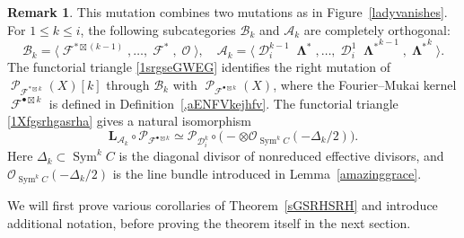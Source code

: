 \documentclass[11pt,letterpaper]{amsart}
\theoremstyle{plain}
\theoremstyle{definition}
\newtheorem{remark}[theorem]{Remark}
\theoremstyle{remark}
\numberwithin{equation}{section}
\DeclareMathOperator{\cD}{\mathcal{D}}
\DeclareMathOperator{\cF}{\mathcal{F}}
\DeclareMathOperator{\cO}{\mathcal{O}}
\DeclareMathOperator{\cP}{\mathcal{P}}
\DeclareMathOperator{\bLambda}{{\boldsymbol\Lambda}}
\begin{document}
\begin{remark}\label{Remark33}
This mutation combines two mutations as in Figure~\ref{ladyvanishes}. 
For $1\le k\le i$, the following subcategories $\mathcal B_k$ and $\mathcal A_k$
 are completely orthogonal:
\[
\mathcal B_k=
\bigl\langle\cF^{*\boxtimes(k-1)},\ldots,\cF^*,\cO\bigr\rangle,
\quad
\mathcal A_k=
\bigl\langle
\cD_i^{k-1}\bLambda^*,\ldots,
\cD_i^1{\bLambda^*}^{k-1},{\bLambda^*}^{k}
\bigr\rangle.
\]
The functorial triangle
\eqref{1srgseGWEG} identifies the right mutation of
$\cP_{\cF^{*\boxtimes k}}(X)[k]$ through $\mathcal B_k$
with $\cP_{\cF^{\bullet\boxtimes k}}(X)$, where the Fourier--Mukai kernel $\cF^{\bullet\boxtimes k}$ 
is defined in Definition~\ref{,aENFVkejhfv}.
The functorial
triangle \eqref{1Xfgsrhgasrha} gives a natural isomorphism
\[
 \mathbf L_{\mathcal A_k}\circ
 \mathcal P_{\mathcal F^{\bullet\boxtimes k}}
 \simeq
 \mathcal P_{\mathcal D_i^k}\circ
 \bigl(-\otimes
 \mathcal O_{\operatorname{Sym}^kC}(-\Delta_k/2)\bigr).
\]
Here $\Delta_k\subset\operatorname{Sym}^kC$ is the diagonal divisor of
nonreduced effective divisors, and
$\mathcal O_{\operatorname{Sym}^kC}(-\Delta_k/2)$ is the  line bundle
 introduced in
Lemma~\ref{amazinggrace}.
\end{remark}


We  will first prove various corollaries of Theorem~\ref{sGSRHSRH} 
and introduce additional notation,
before proving the theorem itself in the next section.
\end{document}
